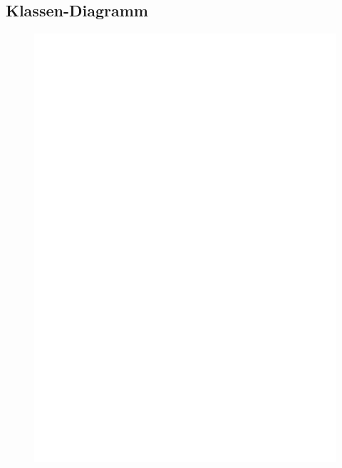 \subsection{Klassen-Diagramm}
	\begin{figure}[H]
        \centering
        \includegraphics[scale=0.75]{images/JSON-Parser.pdf}
    \end{figure}